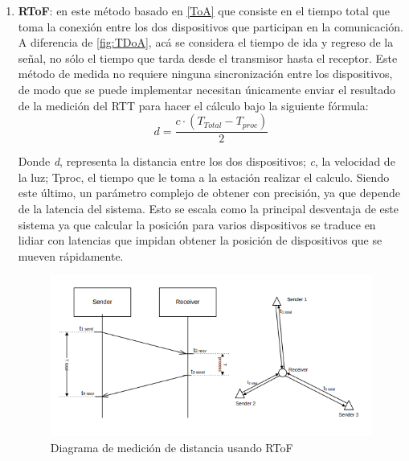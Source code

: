\begin{itemize}
{\begin{enumerate}
{        }
        \newpage 
        \item {\textbf{\ac{RToF}}: en este método basado en \ref{ToA} que consiste en el tiempo total que toma la conexión entre los dos dispositivos que participan en la comunicación. A diferencia de \ref{fig:TDoA}, acá se considera el tiempo de ida y regreso de la señal, no sólo el tiempo que tarda desde el transmisor hasta el receptor. Este método de medida no requiere ninguna sincronización entre los dispositivos, de modo que se puede implementar necesitan únicamente enviar el resultado de la medición del \ac{RTT} para hacer el cálculo bajo la siguiente fórmula:\\
        
        \begin{equation}
            d = \dfrac{c\cdot{\left(T_{Total} - T_{proc}\right)}}{2}
        \end{equation}
        
        Donde \textit{d}, representa la distancia entre los dos dispositivos; \textit{c}, la velocidad de la luz; Tproc, el tiempo que le toma a la estación realizar el calculo. Siendo este último, un parámetro complejo de obtener con precisión, ya que depende de la latencia del sistema. Esto se escala como la principal desventaja de este sistema ya que calcular la posición para varios dispositivos se traduce en lidiar con latencias que impidan obtener la posición de dispositivos que se mueven rápidamente.
        
        \begin{figure}[h!]
            \centering
            \includegraphics[scale=0.52]{Tesis/images/rtof}
            \caption{Diagrama de medición de distancia usando \ac{RToF}}
            \label{fig:RTOF}
        \end{figure}
        }
    \end{enumerate}
            }


\end{itemize}

